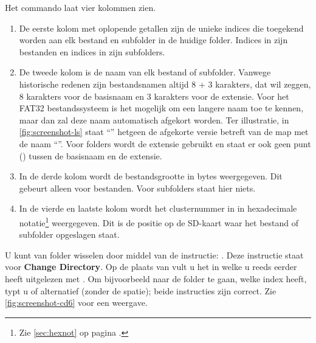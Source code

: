 Het  commando laat vier kolommen zien. 

\begin{enumerate}[noitemsep]
    \item De eerste kolom met oplopende getallen zijn de unieke indices die toegekend worden aan elk bestand en subfolder in de huidige folder. Indices in  zijn bestanden en indices in  zijn subfolders.  
    \item De tweede kolom is de naam van elk bestand of subfolder. Vanwege historische redenen zijn bestandsnamen altijd 8 + 3 karakters, dat wil zeggen, 8 karakters voor de basisnaam en 3 karakters voor de extensie. Voor het FAT32 bestandssysteem is het mogelijk om een langere naam toe te kennen, maar dan zal deze naam automatisch afgekort worden. Ter illustratie, in \cref{fig:screenshot-ls} staat ``\;'' hetgeen de afgekorte versie betreft van de map met de naam ``''. Voor folders wordt de extensie  gebruikt en staat er ook geen punt () tussen de basisnaam en de extensie.  
    \item In de derde kolom wordt de bestandsgrootte in bytes weergegeven. Dit gebeurt alleen voor bestanden. Voor subfolders staat hier niets. 
    \item In de vierde en laatste kolom wordt het clusternummer in  in hexadecimale notatie\footnote{Zie \cref{sec:hexnot} op pagina \pageref{sec:hexnot}.} weergegeven. Dit is de positie op de SD-kaart waar het bestand of subfolder opgeslagen staat.
\end{enumerate}


U kunt van folder wisselen door middel van de instructie: . Deze instructie staat voor \textbf{Change Directory}. Op de plaats van  vult u het  in welke u reeds eerder heeft uitgelezen met . Om bijvoorbeeld naar de folder  te gaan, welke index  heeft, typt u  of alternatief  (zonder de spatie); beide instructies zijn correct. Zie \cref{fig:screenshot-cd6} voor een weergave.

